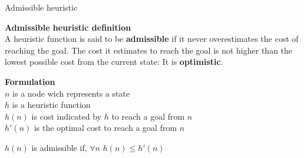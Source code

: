 \documentclass[9pt]{beamer}
\begin{document}
\begin{frame}{Admissible heuristic}
\begin{small}
\textbf{Admissible heuristic definition} \cite{Russell2002}\\
A heuristic function is said to be \textbf{admissible} if it never overestimates the cost of reaching the goal. The cost it estimates to reach the goal is not higher than the lowest possible cost from the current state: It is \textbf{optimistic}.

\textbf{Formulation}\\
$n$ is a node wich represents a state\\
$h$ is a heuristic function\\
$h(n)$ is cost indicated by $h$ to reach a goal from $n$\\
$h'(n)$ is the optimal cost to reach a goal from $n$\\

\begin{center}
   \textcolor{CS-1}{$h(n)$ is admissible if, $\forall n$
   $h(n) \leq h'(n)$}
\end{center}
\end{small}
\end{frame}
\end{document}
